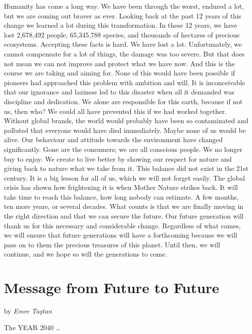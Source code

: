 \documentclass[]{book}
\begin{document}
Humanity has come a long way. We have been through the worst, endured a lot, but we are coming out braver as ever. Looking back at the past 12 years of this change we learned a lot during this transformation. In these 12 years, we have lost 2,678,492 people, 65,345,788 species, and thousands of hectares of precious ecosystems. Accepting these facts is hard. We have lost a lot. Unfortunately, we cannot compensate for a lot of things, the damage was too severe. But that does not mean we can not improve and protect what we have now. And this is the course we are taking and aiming for.
None of this would have been possible if pioneers had approached this problem with ambition and will. It is inconceivable that our ignorance and laziness led to this disaster when all it demanded was discipline and dedication. We alone are responsible for this earth, because if not us, then who? We could all have prevented this if we had worked together. Without global brands, the world would probably have been so contaminated and polluted that everyone would have died immediately. Maybe none of us would be alive. Our behaviour and attitude towards the environment have changed significantly. Gone are the consumers; we are all conscious people. We no longer buy to enjoy. We create to live better by showing our respect for nature and giving back to nature what we take from it. This balance did not exist in the 21st century. It is a big lesson for all of us, which we will not forget easily. The global crisis has shown how frightening it is when Mother Nature strikes back. It will take time to reach this balance, how long nobody can estimate. A few months, ten more years, or several decades. What counts is that we are finally moving in the right direction and that we can secure the future. Our future generation will thank us for this necessary and considerable change. Regardless of what comes, we will ensure that future generations will have a forthcoming because we will pass on to them the precious treasures of this planet. Until then, we will continue, and we hope so will the generations to come.

\hypertarget{message-from-future-to-future}{%
\chapter{Message from Future to Future}\label{message-from-future-to-future}}

by \emph{Emre Taştan}

The YEAR 2040 \ldots{}
\end{document}
